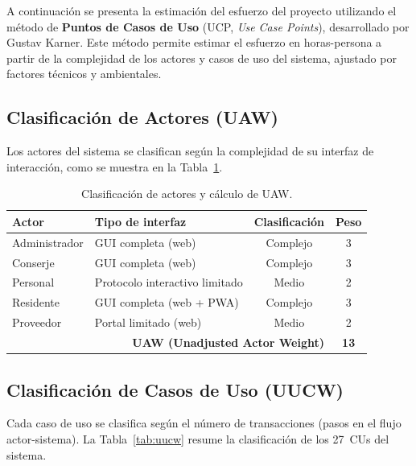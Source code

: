 A continuación se presenta la estimación del esfuerzo del proyecto utilizando el método de \textbf{Puntos de Casos de Uso} (UCP, \textit{Use Case Points}), desarrollado por Gustav Karner. Este método permite estimar el esfuerzo en horas-persona a partir de la complejidad de los actores y casos de uso del sistema, ajustado por factores técnicos y ambientales.

\subsection{Clasificación de Actores (UAW)}

Los actores del sistema se clasifican según la complejidad de su interfaz de interacción, como se muestra en la Tabla~\ref{tab:uaw}.

\begin{table}[H]
\centering
\begin{tabular}{|p{}|p{}|c|c|}
\hline
\textbf{Actor} & \textbf{Tipo de interfaz} & \textbf{Clasificación} & \textbf{Peso} \\
\hline
Administrador & GUI completa (web) & Complejo & 3 \\
\hline
Conserje & GUI completa (web) & Complejo & 3 \\
\hline
Personal & Protocolo interactivo limitado & Medio & 2 \\
\hline
Residente & GUI completa (web + PWA) & Complejo & 3 \\
\hline
Proveedor & Portal limitado (web) & Medio & 2 \\
\hline
\multicolumn{3}{|r|}{\textbf{UAW (Unadjusted Actor Weight)}} & \textbf{13} \\
\hline
\end{tabular}
\caption{Clasificación de actores y cálculo de UAW.}
\label{tab:uaw}
\end{table}

\subsection{Clasificación de Casos de Uso (UUCW)}

Cada caso de uso se clasifica según el número de transacciones (pasos en el flujo actor-sistema). La Tabla~\ref{tab:uucw} resume la clasificación de los 27~CUs del sistema.

